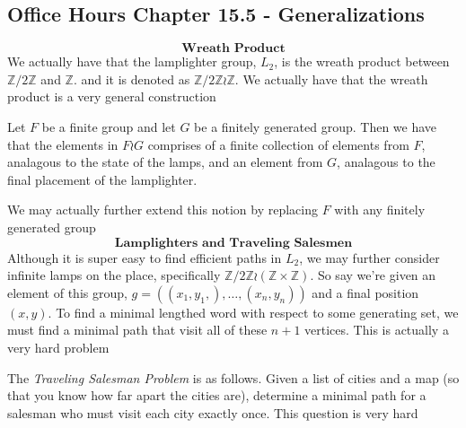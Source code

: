 \subsection{Office Hours Chapter 15.5 - Generalizations}
\[\textbf{Wreath Product}\]
We actually have that the lamplighter group, $L_2$, is the wreath product between $\mathbb{Z}/2\mathbb{Z}$ and $\mathbb{Z}$. and it is denoted as $\mathbb{Z}/2\mathbb{Z}\wr \mathbb{Z}$. We actually have that the wreath product is a very general construction
\begin{definition}
    Let $F$ be a finite group and let $G$ be a finitely generated group. Then we have that the elements in $F\wr G$ comprises of a finite collection of elements from $F$, analagous to the state of the lamps, and an element from $G$, analagous to the final placement of the lamplighter.
\end{definition}
We may actually further extend this notion by replacing $F$ with any finitely generated group
\[\textbf{Lamplighters and Traveling Salesmen}\]
Although it is super easy to find efficient paths in $L_2$, we may further consider infinite lamps on the place, specifically $\mathbb{Z}/2\mathbb{Z}\wr(\mathbb{Z}\times\mathbb{Z})$. So say we're given an element of this group, $g=((x_1,y_1,),\ldots,(x_n,y_n))$ and a final position $(x,y)$. To find a minimal lengthed word with respect to some generating set, we must find a minimal path that visit all of these $n+1$ vertices. This is actually a very hard problem
\begin{remark}
    The \textit{Traveling Salesman Problem} is as follows. Given a list of cities and a map (so that you know how far apart the cities are), determine a minimal path for a salesman who must visit each city exactly once. This question is very hard
\end{remark}
